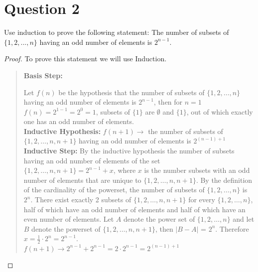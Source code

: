 \documentclass{article}
\begin{document}
\section*{Question 2}
 Use induction to prove the following statement:
The number of subsets of $\{1,2,...,n\}$ having an odd number of elements is $2^{n-1}$. \\
\begin{proof} To prove this statement we will use Induction.
  \begin{quote}
   \textbf{Basis Step:}

       Let $f(n)$ be the hypothesis that the number of subsets of $\{1,2,\dots,n\}$ having an odd number of elements 
       is $2^{n-1}$, then for $n=1$
       $f(n) = 2^{1-1} = 2^0 = 1$, subsets of $\{1\}$ are $\emptyset$ and $\{1\}$, out of which exactly one has an odd number of elements. \\
       
   \textbf{Inductive Hypothesis:}
       $f(n+1) \rightarrow$ the number of subsets of $\{1,2,\dots,n,n+1\}$ having an odd number of elements is $2^{(n-1)+1}$\\

   \textbf{Inductive Step:}
       By the inductive hypothesis the number of subsets having an odd number of elements of the set \\ $\{1,2,\dots,n,n+1\} = 2^{n-1} + x$, where $x$ is the
       number subsets with an odd number of elements that are unique to $\{1,2,\dots,n,n+1\}$. By the definition of the cardinality of the powerset, the number
       of subsets of $\{1,2,\dots,n\}$ is $2^n$. There exist exactly 2 subsets of  $\{1,2,\dots,n,n+1\}$
       for every $\{1,2,\dots,n\}$, half of which have an odd number of elements and half of which have an even number of elements. Let $A$ denote the power set of
       $\{1,2,\dots,n\}$ and let $B$ denote the powerset of $\{1,2,\dots,n,n+1\}$, then $|B - A|$ = $2^n$.
       Therefore $x = \frac{1}{2} \cdot 2^n = 2^{n-1}$.\\ $f(n + 1) \rightarrow 2^{n-1} + 2^{n-1} = 2\cdot 2^{n-1} =  2^{(n-1)+1}$
       
  \end{quote}
\end{proof}
\end{document}
